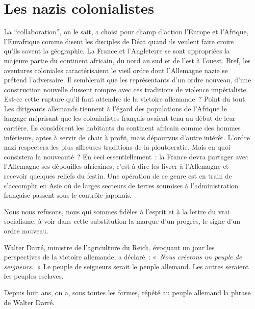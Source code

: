 \documentclass[french,twoside]{book} %
\begin{document}
\section[Les nazis colonialistes]{Les nazis colonialistes}
\noindent La “collaboration”, on le sait, a choisi pour champ d’action l’Europe et l’Afrique, l’Eurafrique comme disent les disciples de Déat quand ils veulent faire croire qu’ils savent la géographie. La France et l’Angleterre se sont appropriées la majeure partie du continent africain, du nord au sud et de l’est à l’ouest. Bref, les aventures coloniales caractérisaient le vieil ordre dont l’Allemagne nazie se prétend l’adversaire. Il semblerait que les représentants d’un ordre nouveau, d’une construction nouvelle dussent rompre avec ces traditions de violence impérialiste. Est-ce cette rupture qu’il faut attendre de la victoire allemande ? Point du tout. Les dirigeants allemands tiennent à l’égard des populations de l’Afrique le langage méprisant que les colonialistes français avaient tenu au début de leur carrière. Ils considèrent les habitants du continent africain comme des hommes inférieurs, aptes à servir de chair à profit, mais dépourvus d’autre intérêt. L’ordre nazi respectera les plus affreuses traditions de la ploutocratie. Mais en quoi consistera la nouveauté ? En ceci essentiellement : la France devra partager avec l’Allemagne ses dépouilles africaines, c’est-à-dire les livrer à l’Allemagne et recevoir quelques reliefs du festin. Une opération de ce genre est en train de s’accomplir en Asie où de larges secteurs de terres soumises à l’administration française passent sous le contrôle japonais.\par
Nous nous refusons, nous qui sommes fidèles à l’esprit et à la lettre du vrai socialisme, à voir dans cette substitution la marque d’un progrès, le signe d’un ordre nouveau.\par
Walter Darré, ministre de l’agriculture du Reich, évoquant un jour les perspectives de la victoire allemande, a déclaré : « \emph{Nous créerons un peuple de seigneurs.} » Le peuple de seigneurs serait le peuple allemand. Les autres seraient les peuples esclaves.\par
Depuis huit ans, on a, sous toutes les formes, répété au peuple allemand la phrase de Walter Darré.
\end{document}
